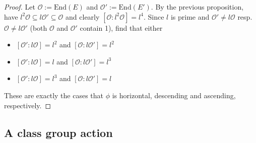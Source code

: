 \documentclass{scrartcl}
\newcommand{\End}{\mathrm{End}}
\newcommand{\Order}{\mathcal{O}}
\theoremstyle{definition}
\begin{document}
\begin{proof}
    Let $\Order := \End(E)$ and $\Order' := \End(E')$.
    By the previous proposition, have $l^2\Order \subseteq l\Order' \subseteq \Order$ and clearly $[\Order : l^2\Order] = l^4$.
    Since $l$ is prime and $\Order' \neq l\Order$ resp. $\Order \neq l\Order'$ (both $\Order$ and $\Order'$ contain 1), find that either
    \begin{itemize}
        \item $[\Order' : l\Order] = l^2$ and $[\Order : l\Order'] = l^2$
        \item $[\Order' : l\Order] = l$ and $[\Order : l\Order'] = l^3$
        \item $[\Order' : l\Order] = l^3$ and $[\Order : l\Order'] = l$
    \end{itemize}
    These are exactly the cases that $\phi$ is horizontal, descending and ascending, respectively.
\end{proof}

\subsection{A class group action}
\end{document}
